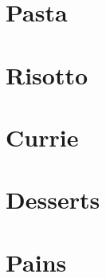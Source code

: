 \documentclass[twosides, 11pt]{book}
\begin{document}
\maketitle
\tableofcontents

\chapter{Pasta}


\chapter{Risotto}



\chapter{Currie}




\chapter{Desserts}




\chapter{Pains}




\clearpage
\printindex
\end{document}
